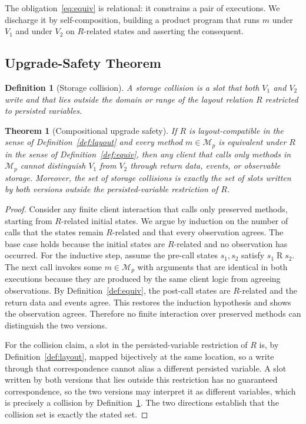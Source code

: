 \documentclass[journal]{IEEEtran}
\newtheorem{definition}{Definition}
\newtheorem{theorem}{Theorem}
\begin{document}
The obligation~\eqref{eq:equiv} is relational: it constrains a pair of executions. We discharge it by self-composition, building a product program that runs $m$ under $V_1$ and under $V_2$ on $R$-related states and asserting the consequent.

\subsection{Upgrade-Safety Theorem}
\begin{definition}[Storage collision]
\label{def:collision}
A storage collision is a slot that both $V_1$ and $V_2$ write and that lies outside the domain or range of the layout relation $R$ restricted to persisted variables.
\end{definition}

\begin{theorem}[Compositional upgrade safety]
\label{thm:upgrade}
If $R$ is layout-compatible in the sense of Definition~\ref{def:layout} and every method $m \in \mathcal{M}_p$ is equivalent under $R$ in the sense of Definition~\ref{def:equiv}, then any client that calls only methods in $\mathcal{M}_p$ cannot distinguish $V_1$ from $V_2$ through return data, events, or observable storage. Moreover, the set of storage collisions is exactly the set of slots written by both versions outside the persisted-variable restriction of $R$.
\end{theorem}
\begin{proof}
Consider any finite client interaction that calls only preserved methods, starting from $R$-related initial states. We argue by induction on the number of calls that the states remain $R$-related and that every observation agrees. The base case holds because the initial states are $R$-related and no observation has occurred. For the inductive step, assume the pre-call states $s_1, s_2$ satisfy $s_1 \mathbin{R} s_2$. The next call invokes some $m \in \mathcal{M}_p$ with arguments that are identical in both executions because they are produced by the same client logic from agreeing observations. By Definition~\ref{def:equiv}, the post-call states are $R$-related and the return data and events agree. This restores the induction hypothesis and shows the observation agrees. Therefore no finite interaction over preserved methods can distinguish the two versions.

For the collision claim, a slot in the persisted-variable restriction of $R$ is, by Definition~\ref{def:layout}, mapped bijectively at the same location, so a write through that correspondence cannot alias a different persisted variable. A slot written by both versions that lies outside this restriction has no guaranteed correspondence, so the two versions may interpret it as different variables, which is precisely a collision by Definition~\ref{def:collision}. The two directions establish that the collision set is exactly the stated set.
\end{proof}
\end{document}
